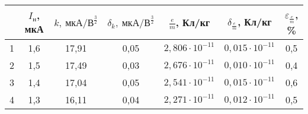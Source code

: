 \begin{table}
\centering
\label{tbl:7}
\begin{tabular}{|c|c|c|c|c|c|c|}
\hline
 & $I_н$, мкА & $k,\ мкА / В^{\frac{3}{2}}$ & $\delta_k,\ мкА / В^{\frac{3}{2}}$ & $\frac{e}{m}$, Кл/кг & $\delta_{\frac{e}{m}}$, Кл/кг & $\varepsilon_{\frac{e}{m}}$, \% \\
\hline
1 & 1,6 & 17,91 & 0,05 & $2,806 \cdot 10^{-11}$ & $0,015 \cdot 10^{-11}$ & 0,5 \\
\cline{1-7}
2 & 1,5 & 17,49 & 0,03 & $2,676 \cdot 10^{-11}$ & $0,010 \cdot 10^{-11}$ & 0,4 \\
\cline{1-7}
3 & 1,4 & 17,04 & 0,05 & $2,541 \cdot 10^{-11}$ & $0,015 \cdot 10^{-11}$ & 0,6 \\
\cline{1-7}
4 & 1,3 & 16,11 & 0,04 & $2,271 \cdot 10^{-11}$ & $0,012 \cdot 10^{-11}$ & 0,5 \\
\cline{1-7}
\hline
\end{tabular}
\end{table}

